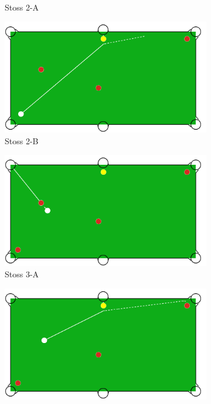 \begin{figure}[h!]
\begin{subfigure}[b]{0.4\textwidth}
        \caption{Stoss 2-A}
        \label{fig:situation_2_solution_2a}
    \end{subfigure}
    \hfill
    \begin{subfigure}[b]{0.4\textwidth}
        \centering
        \includegraphics[width=1.0\linewidth]{../common/04_results/resources/simple_search/situation_diverse_solution_deep_search_2b.PNG}
        \caption{Stoss 2-B}
        \label{fig:situation_2_solution_2b}
    \end{subfigure}
    \hfill
    \begin{subfigure}[b]{0.4\textwidth}
        \centering
        \includegraphics[width=1.0\linewidth]{../common/04_results/resources/simple_search/situation_diverse_solution_deep_search_3a.PNG}
        \caption{Stoss 3-A}
        \label{fig:situation_2_solution_3a}
    \end{subfigure}
    \hfill
    \begin{subfigure}[b]{0.4\textwidth}
        \centering
        \includegraphics[width=1.0\linewidth]{../common/04_results/resources/simple_search/situation_diverse_solution_deep_search_3b.PNG}

\end{subfigure}
\end{figure}
